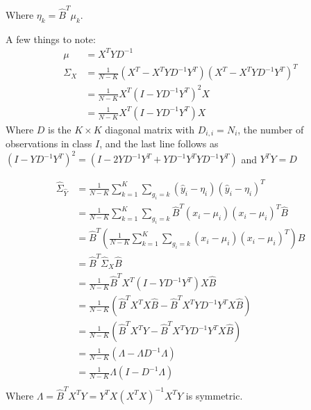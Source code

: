 Where $\eta_k = \hat{B}^T \mu_k$.


A few things to note:
\begin{align*}
    \mu &= X^T YD^{-1}\\
    \Sigma_X &= \frac{1}{N-K}\left(X^T - X^T Y D^{-1} Y^T\right) \left(X^T - X^T Y D^{-1} Y^T\right)^T\\
    &= \frac{1}{N-K} X^T \left(I - Y D^{-1} Y^T\right)^2 X\\
    &= \frac{1}{N-K} X^T \left(I - Y D^{-1} Y^T\right) X 
\end{align*}
Where $D$ is the $K \times K$ diagonal matrix with $D_{i,i} = N_i$, the number of observations in class $I$, and the last line follows as $(I - Y D^{-1} Y^T)^2 = (I - 2 Y D^{-1} Y^T + Y D^{-1} Y^T Y D^{-1} Y^T)$ and $Y^T Y = D$

\begin{align*}
    \hat{\Sigma}_{\hat{Y}} &= \frac{1}{N-K}\sum_{k = 1}^K \sum_{g_i = k} (\hat{y}_i - \eta_i) (\hat{y}_i - \eta_i)^T\\
    &= \frac{1}{N-K}\sum_{k = 1}^K \sum_{g_i = k} \hat{B}^T(x_i - \mu_i) (x_i - \mu_i)^T \hat{B}\\
    &=\hat{B}^T\left( \frac{1}{N-K}\sum_{k = 1}^K \sum_{g_i = k} (x_i - \mu_i) (x_i - \mu_i)^T \right)\hat{B}\\ 
    &=\hat{B}^T \hat{\Sigma}_X\hat{B}\\
    &=\frac{1}{N-K} \hat{B}^T X^T \left(I - Y D^{-1} Y^T\right) X\hat{B}\\
    &=\frac{1}{N-K} \left(\hat{B}^T X^T X\hat{B} - \hat{B}^T X^T Y D^{-1} Y^T X\hat{B}\right) \\
    &=\frac{1}{N-K} \left(\hat{B}^T X^T Y - \hat{B}^T X^T Y D^{-1} Y^T X\hat{B}\right) \\
    &=\frac{1}{N-K} \left(\Lambda - \Lambda D^{-1}\Lambda \right) \\
    &=\frac{1}{N-K} \Lambda\left(I - D^{-1}\Lambda \right) \\
\end{align*}
Where $\Lambda = \hat{B}^T X^T Y = Y^T X (X^T X)^{-1} X^T Y$ is symmetric.

